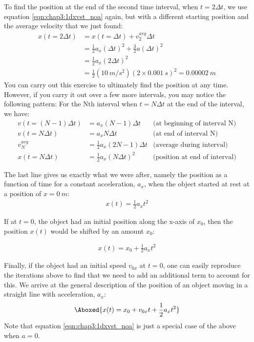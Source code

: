 To find the position at the end of the second time interval, when $t=2\Delta t$, we use equation \ref{eqn:chap3:1dxvst_noa} again, but with a different starting position and the average velocity that we just found:
\begin{align*}
x(t=2\Delta t) &= x(t=\Delta t) +v_2^{avg}\Delta t\\
&= \frac{1}{2}a_x(\Delta t)^2+\frac{3}{2}a(\Delta t)^2\\
&= \frac{1}{2}a_x(2\Delta t)^2\\
&=\frac{1}{2}(\SI{10}{m/s^2})(2\times\SI{0.001}{s})^2=\SI{0.00002}{m}
\end{align*}
You can carry out this exercise to ultimately find the position at any time. However, if you carry it out over a few more intervals, you may notice the following pattern: For the Nth interval when $t=N\Delta t$ at the end of the interval, we have:
\begin{align*}
v(t=(N-1)\Delta t) &= a_x (N-1) \Delta t &\text{(at beginning of interval N)}\\
v(t=N\Delta t) &= a_x N \Delta t &\text{(at end of interval N)}\\
v_N^{avg}&=\frac{1}{2}a_x(2N-1)\Delta t&\text{(average during interval)}\\
x(t=N\Delta t)&=\frac{1}{2}a_x(N\Delta t)^2&\text{(position at end of interval)}
\end{align*}

The last line gives us exactly what we were after, namely the position as a function of time for a constant acceleration, $a_x$, when the object started at rest at a position of $x=\SI{0}{m}$:
\begin{align}
\label{eqn:chap3:1dxoft_novonoxo}
 x(t) = \frac{1}{2} a_x t^2
\end{align}

If at $t=0$, the object had an initial position along the x-axis of $x_0$, then the position $x(t)$ would be shifted by an amount $x_0$:

\begin{align}
\label{eqn:chap3:1dxoft_novo}
 x(t) = x_0+\frac{1}{2} a_x t^2
\end{align}

Finally, if the object had an initial speed $v_{0x}$ at $t=0$, one can easily reproduce the iterations above to find that we need to add an additional term to account for this. We arrive at the general description of the position of an object moving in a straight line with acceleration, $a_x$:
\begin{align}
\label{eqn:chap3:1dxvst}
\Aboxed{ x(t) = x_0+v_{0x}t+ \frac{1}{2}a_xt^2}
\end{align}
Note that equation \ref{eqn:chap3:1dxvst_noa} is just a special case of the above when $a=0$. 

